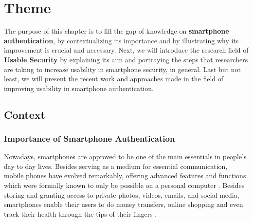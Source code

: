 
\chapter{Theme}\label{ch:second}

The purpose of this chapter is to fill the gap of knowledge on \textbf{smartphone authentication}, by contextualizing its importance and by illustrating why its improvement is crucial and necessary. Next, we will introduce the research field of \textbf{Usable Security} by explaining its aim and portraying the steps that researchers are taking to increase usability in smartphone security, in general. Last but not least, we will present the recent work and approaches made in the field of improving usability in smartphone authentication.   

\section{Context}

\subsection{Importance of Smartphone Authentication} \label{2.1.1}

Nowadays, smartphones are approved to be one of the main essentials in people's day to day lives. Besides serving as a medium for essential communication, mobile phones have evolved remarkably, offering advanced features and functions which were formally known to only be possible on a personal computer \cite{Alsaleh}. Besides storing and granting access to private photos, videos, emails, and social media, smartphones enable their users to do money transfers, online shopping and even track their health through the tips of their fingers \cite{Egelman:2014:YRL:2660267.2660273,Albayram:2017:BUL:3235924.3235929,Schloeglhofer}. \\

